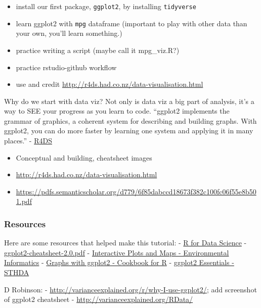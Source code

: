 \documentclass[]{book}
\providecommand{\tightlist}{%
  \setlength{\itemsep}{0pt}\setlength{\parskip}{0pt}}
\theoremstyle{definition}
\theoremstyle{definition}
\theoremstyle{definition}
\theoremstyle{remark}
\begin{document}
\begin{itemize}
\tightlist
\item
  install our first package, \texttt{ggplot2}, by installing
  \texttt{tidyverse}
\item
  learn ggplot2 with \texttt{mpg} dataframe (important to play with
  other data than your own, you'll learn something.)
\item
  practice writing a script (maybe call it mpg\_viz.R?)
\item
  practice rstudio-github workflow
\item
  use and credit \url{http://r4ds.had.co.nz/data-visualisation.html}
\end{itemize}

Why do we start with data viz? Not only is data viz a big part of
analysis, it's a way to SEE your progress as you learn to code.
``ggplot2 implements the grammar of graphics, a coherent system for
describing and building graphs. With ggplot2, you can do more faster by
learning one system and applying it in many places.'' -
\href{http://r4ds.had.co.nz/data-visualisation.html}{R4DS}

\begin{itemize}
\item
  Conceptual and building, cheatsheet images
\item
  \url{http://r4ds.had.co.nz/data-visualisation.html}
\item
  \url{https://pdfs.semanticscholar.org/d779/6f85dabccd18673f382c100fc06f55e8b501.pdf}
\end{itemize}

\subsubsection{Resources}\label{resources-1}

Here are some resources that helped make this tutorial: -
\href{http://r4ds.had.co.nz/data-visualisation.html}{R for Data Science}
-
\href{../cheatsheets/ggplot2-cheatsheet-2.0.pdf}{ggplot2-cheatsheet-2.0.pdf}
-
\href{http://ucsb-bren.github.io/env-info/wk06_widgets.html}{Interactive
Plots and Maps - Environmental Informatics} -
\href{http://www.cookbook-r.com/Graphs/\#graphs-with-ggplot2}{Graphs
with ggplot2 - Cookbook for R} -
\href{http://www.sthda.com/english/wiki/ggplot2-essentials}{ggplot2
Essentials - STHDA}

D Robinson: - \url{http://varianceexplained.org/r/why-I-use-ggplot2/};
add screenshot of ggplot2 cheatsheet -
\url{http://varianceexplained.org/RData/}
\end{document}
